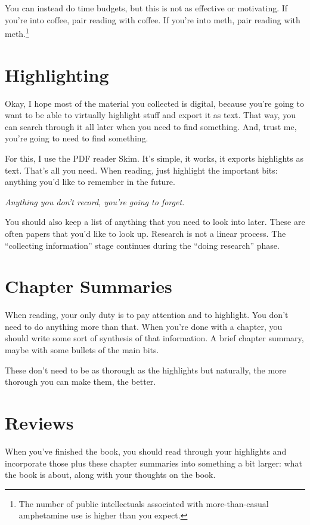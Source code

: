 You can instead do time budgets, but this is not as effective or motivating. If
you're into coffee, pair reading with coffee. If you're into meth, pair reading with meth.\footnote{The number of public intellectuals associated with more-than-casual amphetamine use is higher than you expect.}

\section{Highlighting}

Okay, I hope most of the material you collected is digital, because you're
going to want to be able to virtually highlight stuff and export it as
text. That way, you can search through it all later when you need to find
something. And, trust me, you're going to need to find something.

For this, I use the PDF reader Skim. It's simple, it works, it exports
highlights as text. That's all you need. When reading, just
highlight the important bits: anything you'd like to remember in the future.

\textit{Anything you don't record, you're going to forget.}

You should also keep a list of anything that you need to look into later. These are
often papers that you'd like to look up. Research is not a linear process. The
``collecting information'' stage continues during the ``doing research'' phase.

\section{Chapter Summaries}

When reading, your only duty is to pay attention and to highlight. You don't
need to do anything more than that. When you're done with a chapter, you should
write some sort of synthesis of that information. A brief chapter summary, maybe
with some bullets of the main bits.

These don't need to be as thorough as the highlights but naturally, the more
thorough you can make them, the better.

\section{Reviews}

When you've finished the book, you should read through your highlights
and incorporate those plus these chapter
summaries into something a bit larger: what the book is about, along with your
thoughts on the book.

